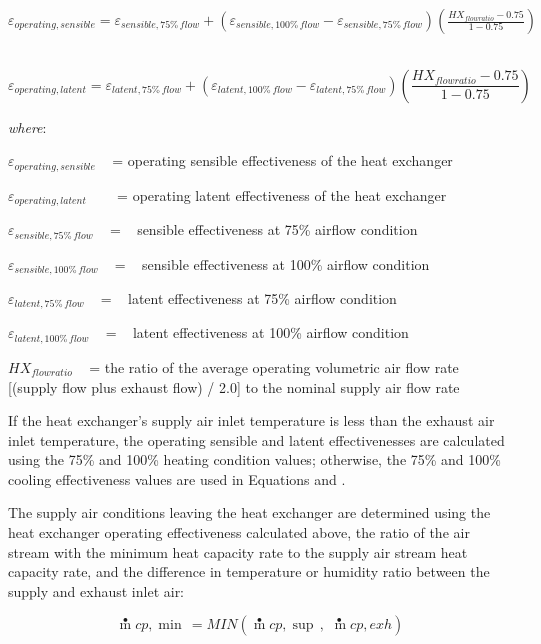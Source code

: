 \({\varepsilon_{operating,sensible}} = {\varepsilon_{sensible,75\% \,flow}} + ({\varepsilon_{sensible,100\% \,flow}} - {\varepsilon_{sensible,75\% \,flow}})\left( {\frac{{H{X_{flowratio}} - 0.75}}{{1 - 0.75}}} \right)\) ~

\begin{equation}
{\varepsilon_{operating,latent}} = {\varepsilon_{latent,75\% \,flow}} + ({\varepsilon_{latent,100\% \,flow}} - {\varepsilon_{latent,75\% \,flow}})\left( {\frac{{H{X_{flowratio}} - 0.75}}{{1 - 0.75}}} \right)
\end{equation}

\emph{where}:

\({\varepsilon_{operating,sensible}}\) ~ = operating sensible effectiveness of the heat exchanger

\({\varepsilon_{operating,latent}}\) ~~~ = operating latent effectiveness of the heat exchanger

\({\varepsilon_{sensible,75\% \,flow}}\) ~ = ~ sensible effectiveness at 75\% airflow condition

\({\varepsilon_{sensible,100\% \,flow}}\) ~ = ~ sensible effectiveness at 100\% airflow condition

\({\varepsilon_{latent,75\% \,flow}}\) ~ = ~ latent effectiveness at 75\% airflow condition

\({\varepsilon_{latent,100\% \,flow}}\) ~ = ~ latent effectiveness at 100\% airflow condition

\(H{X_{flowratio}}\) ~ = the ratio of the average operating volumetric air flow rate {[}(supply flow plus exhaust flow) / 2.0{]} to the nominal supply air flow rate

If the heat exchanger's supply air inlet temperature is less than the exhaust air inlet temperature, the operating sensible and latent effectivenesses are calculated using the 75\% and 100\% heating condition values; otherwise, the 75\% and 100\% cooling effectiveness values are used in Equations and .

The supply air conditions leaving the heat exchanger are determined using the heat exchanger operating effectiveness calculated above, the ratio of the air stream with the minimum heat capacity rate to the supply air stream heat capacity rate, and the difference in temperature or humidity ratio between the supply and exhaust inlet air:

\begin{equation}
\mathop m\limits^ \bullet  cp,\min \, = MIN(\mathop m\limits^ \bullet  cp,\sup \,,\,\mathop {\,m}\limits^ \bullet  cp,exh)
\end{equation}

